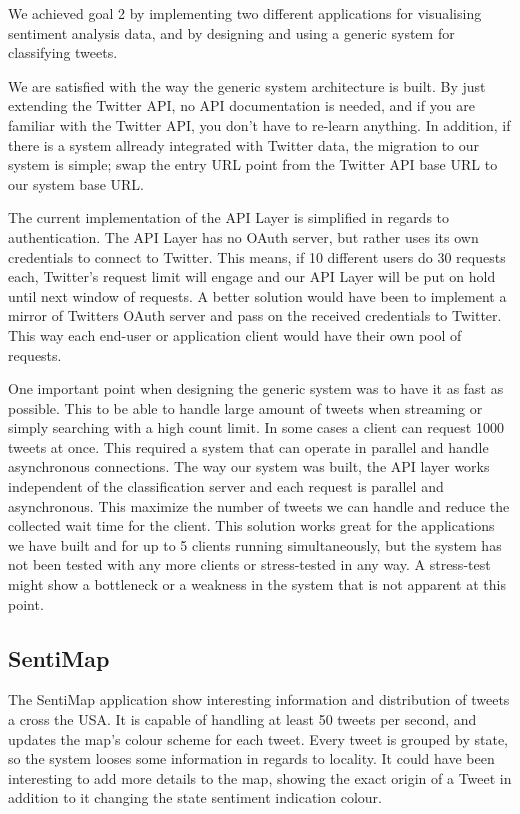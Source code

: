 We achieved goal 2 by implementing two different applications for visualising sentiment analysis data, and by designing and using a generic system for classifying tweets. 

We are satisfied with the way the generic system architecture is built. By just extending the Twitter API, no API documentation is needed, and if you are familiar with the Twitter API, you don't have to re-learn anything. In addition, if there is a system allready integrated with Twitter data, the migration to our system is simple; swap the entry URL point from the Twitter API base URL to our system base URL. 

The current implementation of the API Layer is simplified in regards to authentication. The API Layer has no OAuth server, but rather uses its own credentials to connect to Twitter. This means, if 10 different users do 30 requests each, Twitter's request limit will engage and our API Layer will be put on hold until next window of requests. A better solution would have been to implement a mirror of Twitters OAuth server and pass on the received credentials to Twitter. This way each end-user or application client would have their own pool of requests. 

One important point when designing the generic system was to have it as fast as possible. This to be able to handle large amount of tweets when streaming or simply searching with a high count limit. In some cases a client can request 1000 tweets at once. This required a system that can operate in parallel and handle asynchronous connections. The way our system was built, the API layer works independent of the classification server and each request is parallel and asynchronous. This maximize the number of tweets we can handle and reduce the collected wait time for the client. This solution works great for the applications we have built and for up to 5 clients running simultaneously, but the system has not been tested with any more clients or stress-tested in any way. A stress-test might show a bottleneck or a weakness in the system that is not apparent at this point. 

\subsection{SentiMap}

The SentiMap application show interesting information and distribution of tweets a cross the USA. It is capable of handling at least 50 tweets per second, and updates the map's colour scheme for each tweet. Every tweet is grouped by state, so the system looses some information in regards to locality. It could have been interesting to add more details to the map, showing the exact origin of a Tweet in addition to it changing the state sentiment indication colour.

